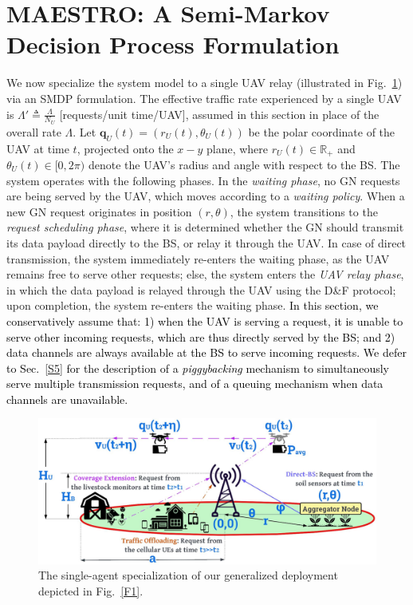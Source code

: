 \documentclass[12pt, draftcls, onecolumn]{IEEEtran}
\theoremstyle{plain}
\theoremstyle{definition}
\theoremstyle{remark}
\newcommand\hlt[1]{\textcolor{black}{#1}}
\begin{document}
\section{MAESTRO: A Semi-Markov Decision Process Formulation}\label{S3}
We now specialize the system model to a single UAV relay (illustrated in Fig.~\ref{F4}) via an SMDP formulation. The effective traffic rate experienced by a single UAV is $\Lambda'{\triangleq}\frac{\Lambda}{N_{U}}$ [requests/unit time/UAV], assumed in this section in place of the overall rate $\Lambda$. Let $\mathbf{q}_{U}(t){=}(r_{U}(t),\theta_{U}(t))$ be the polar coordinate of the UAV at time $t$, projected onto the $x{-}y$ plane, where $r_{U}(t){\in}\mathbb{R}_{+}$ and $\theta_{U}(t){\in}[0,2\pi)$ denote the UAV's radius and angle with respect to the BS. The system operates with the following phases. In the \emph{waiting phase}, no GN requests are being served by the UAV, which moves according to a \emph{waiting policy}. When a new GN request originates in position $(r,\theta)$, the system transitions to the \emph{request scheduling phase}, where it is determined whether the GN should transmit its data payload directly to the BS, or relay it through the UAV. In case of direct transmission, the system immediately re-enters the waiting phase, as the UAV remains free to serve other requests; else, the system enters the \emph{UAV relay phase}, in which the data payload is relayed through the UAV using the D\&F protocol; upon  completion, the system re-enters the waiting phase. \hlt{In this section, we conservatively assume that: 1) when the UAV is serving a request, it is unable to serve other incoming requests, which are thus directly served by the BS; and 2) data channels are always available at the BS to serve incoming requests. We defer to Sec.~\ref{S5} for the description of a \emph{piggybacking} mechanism to simultaneously serve multiple transmission requests, and of a queuing mechanism when data channels are unavailable.}
\begin{figure} [t]
    \centering
    \includegraphics[width=0.7\linewidth]{figs/Deployment_Model_Specialization.jpg}
    \vspace{-2mm}
    \caption{The single-agent specialization of our generalized deployment depicted in Fig.~\ref{F1}.}
    \label{F4}
\end{figure}
\end{document}
